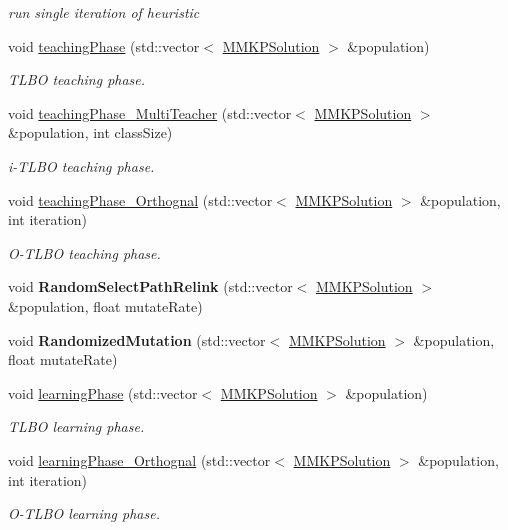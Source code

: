 \begin{DoxyCompactItemize}
\begin{DoxyCompactList}\small\item\em run single iteration of heuristic \end{DoxyCompactList}\item 
void \hyperlink{class_m_m_k_p___t_l_b_o_ab18aa71ce62a00663cedb6d7d8db6f38}{teaching\+Phase} (std\+::vector$<$ \hyperlink{class_m_m_k_p_solution}{M\+M\+K\+P\+Solution} $>$ \&population)
\begin{DoxyCompactList}\small\item\em T\+L\+B\+O teaching phase. \end{DoxyCompactList}\item 
void \hyperlink{class_m_m_k_p___t_l_b_o_a0d3fe3e2570a79a3bd2f29aef3977d7e}{teaching\+Phase\+\_\+\+Multi\+Teacher} (std\+::vector$<$ \hyperlink{class_m_m_k_p_solution}{M\+M\+K\+P\+Solution} $>$ \&population, int class\+Size)
\begin{DoxyCompactList}\small\item\em i-\/\+T\+L\+B\+O teaching phase. \end{DoxyCompactList}\item 
void \hyperlink{class_m_m_k_p___t_l_b_o_a6377147784c758b4f8e782b37f86be73}{teaching\+Phase\+\_\+\+Orthognal} (std\+::vector$<$ \hyperlink{class_m_m_k_p_solution}{M\+M\+K\+P\+Solution} $>$ \&population, int iteration)
\begin{DoxyCompactList}\small\item\em O-\/\+T\+L\+B\+O teaching phase. \end{DoxyCompactList}\item 
\hypertarget{class_m_m_k_p___t_l_b_o_a936e521f1fc9a763608a532452c2d171}{void {\bfseries Random\+Select\+Path\+Relink} (std\+::vector$<$ \hyperlink{class_m_m_k_p_solution}{M\+M\+K\+P\+Solution} $>$ \&population, float mutate\+Rate)}\label{class_m_m_k_p___t_l_b_o_a936e521f1fc9a763608a532452c2d171}

\item 
\hypertarget{class_m_m_k_p___t_l_b_o_ad1941ec6d4421ddbe1fb969e4805e666}{void {\bfseries Randomized\+Mutation} (std\+::vector$<$ \hyperlink{class_m_m_k_p_solution}{M\+M\+K\+P\+Solution} $>$ \&population, float mutate\+Rate)}\label{class_m_m_k_p___t_l_b_o_ad1941ec6d4421ddbe1fb969e4805e666}

\item 
void \hyperlink{class_m_m_k_p___t_l_b_o_ae230bdd3c27355b3b89c23ba3de2cb29}{learning\+Phase} (std\+::vector$<$ \hyperlink{class_m_m_k_p_solution}{M\+M\+K\+P\+Solution} $>$ \&population)
\begin{DoxyCompactList}\small\item\em T\+L\+B\+O learning phase. \end{DoxyCompactList}\item 
void \hyperlink{class_m_m_k_p___t_l_b_o_ad79c49be3f52a25879df07ad70af65d8}{learning\+Phase\+\_\+\+Orthognal} (std\+::vector$<$ \hyperlink{class_m_m_k_p_solution}{M\+M\+K\+P\+Solution} $>$ \&population, int iteration)
\begin{DoxyCompactList}\small\item\em O-\/\+T\+L\+B\+O learning phase. \end{DoxyCompactList}\end{DoxyCompactItemize}
